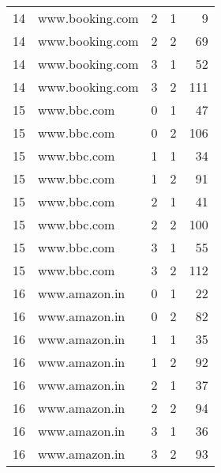 \begin{tabular}{rllrr}
 14 &      www.booking.com &                  2 &       1 &                9 \\
 14 &      www.booking.com &                  2 &       2 &               69 \\
 14 &      www.booking.com &                  3 &       1 &               52 \\
 14 &      www.booking.com &                  3 &       2 &              111 \\
 15 &          www.bbc.com &                  0 &       1 &               47 \\
 15 &          www.bbc.com &                  0 &       2 &              106 \\
 15 &          www.bbc.com &                  1 &       1 &               34 \\
 15 &          www.bbc.com &                  1 &       2 &               91 \\
 15 &          www.bbc.com &                  2 &       1 &               41 \\
 15 &          www.bbc.com &                  2 &       2 &              100 \\
 15 &          www.bbc.com &                  3 &       1 &               55 \\
 15 &          www.bbc.com &                  3 &       2 &              112 \\
 16 &        www.amazon.in &                  0 &       1 &               22 \\
 16 &        www.amazon.in &                  0 &       2 &               82 \\
 16 &        www.amazon.in &                  1 &       1 &               35 \\
 16 &        www.amazon.in &                  1 &       2 &               92 \\
 16 &        www.amazon.in &                  2 &       1 &               37 \\
 16 &        www.amazon.in &                  2 &       2 &               94 \\
 16 &        www.amazon.in &                  3 &       1 &               36 \\
 16 &        www.amazon.in &                  3 &       2 &               93 \\
\bottomrule
\end{tabular}
